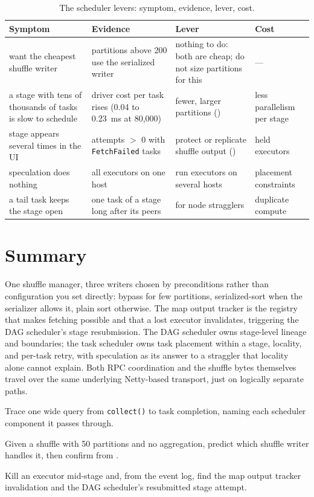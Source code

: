 \begin{table}[htbp]
\centering\footnotesize
\renewcommand{\arraystretch}{1.25}
\begin{tabular}{@{}P{3.1cm}P{3.7cm}P{4.1cm}P{3.2cm}@{}}
\toprule
\textbf{Symptom} & \textbf{Evidence} & \textbf{Lever} & \textbf{Cost} \\
\midrule
want the cheapest shuffle writer & partitions above 200 use the serialized writer & nothing to do: both are cheap; do not size partitions for this & --- \\
a stage with tens of thousands of tasks is slow to schedule & driver cost per task rises (0.04 to 0.23~ms at 80,000) & fewer, larger partitions () & less parallelism per stage \\
stage appears several times in the UI & attempts $>$ 0 with \texttt{FetchFailed} tasks & protect or replicate shuffle output () & held executors \\
speculation does nothing & all executors on one host & run executors on several hosts & placement constraints \\
a tail task keeps the stage open & one task of a stage long after its peers &  for node stragglers & duplicate compute \\
\bottomrule
\end{tabular}
\caption{The scheduler levers: symptom, evidence, lever, cost.}
\label{tab:sched-levers}
\end{table}

\section{Summary}
\label{sec:sched-summary}

One shuffle manager, three writers chosen by preconditions rather than
configuration you set directly: bypass for few partitions, serialized-sort
when the serializer allows it, plain sort otherwise. The map output tracker
is the registry that makes fetching possible and that a lost executor
invalidates, triggering the DAG scheduler's stage resubmission. The DAG
scheduler owns stage-level lineage and boundaries; the task scheduler owns
task placement within a stage, locality, and per-task retry, with
speculation as its answer to a straggler that locality alone cannot explain.
Both RPC coordination and the shuffle bytes themselves travel over the same
underlying Netty-based transport, just on logically separate paths.

\exercisehead
\begin{exercises}
\item Trace one wide query from \texttt{collect()} to task completion, naming
      each scheduler component it passes through.
\item Given a shuffle with 50 partitions and no aggregation, predict which
      shuffle writer handles it, then confirm from
      .
\item Kill an executor mid-stage and, from the event log, find the map
      output tracker invalidation and the DAG scheduler's resubmitted
      stage attempt.
\end{exercises}
